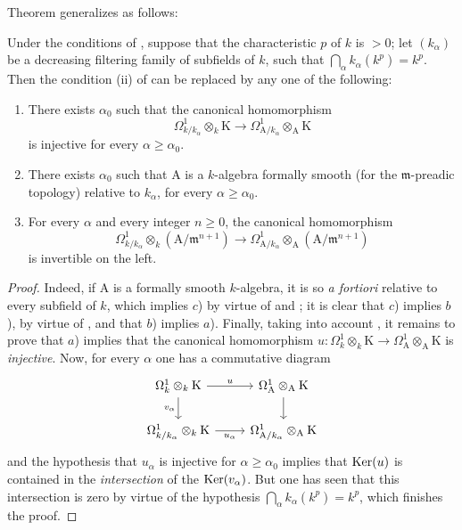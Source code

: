 Theorem  generalizes as follows:

\begin{proposition}[22.2.8]
\label{0.22.2.8}
Under the conditions of , suppose that the characteristic $p$ of $k$ is $>0$; let $(k_\alpha)$ be a decreasing filtering family of subfields of $k$, such that $\bigcap_\alpha k_\alpha(k^p)=k^p$.
Then the condition \textup{(ii)} of  can be replaced by any one of the following:
\begin{enumerate}
  \item[\textup{a)}] There exists $\alpha_0$ such that the canonical homomorphism
  \[
    \Omega^1_{k/k_\alpha}\otimes_k\mathrm{K}\to\Omega^1_{\mathrm{A}/k_\alpha}\otimes_\mathrm{A}\mathrm{K}
  \]
  is injective for every $\alpha\geq\alpha_0$.
  \item[\textup{b)}] There exists $\alpha_0$ such that $\mathrm{A}$ is a $k$-algebra formally smooth (for the $\mathfrak{m}$-preadic topology) relative to $k_\alpha$, for every $\alpha\geq\alpha_0$.
  \item[\textup{c)}] For every $\alpha$ and every integer $n\geq 0$, the canonical homomorphism
  \[
    \Omega^1_{k/k_\alpha}\otimes_k(\mathrm{A}/\mathfrak{m}^{n+1})\to\Omega^1_{\mathrm{A}/k_\alpha}\otimes_\mathrm{A}(\mathrm{A}/\mathfrak{m}^{n+1})
  \]
  is invertible on the left.
\end{enumerate}
\end{proposition}

\begin{proof}
Indeed, if $\mathrm{A}$ is a formally smooth $k$-algebra, it is so \emph{a fortiori} relative to every subfield of $k$, which implies $c$) by virtue of  and ; it is clear that $c$) implies $b$), by virtue of , and that $b$) implies $a$).
Finally, taking into account , it remains to prove that $a$) implies that the canonical homomorphism $u:\Omega^1_k\otimes_k\mathrm{K}\to\Omega^1_\mathrm{A}\otimes_\mathrm{A}\mathrm{K}$ is \emph{injective}.
Now, for every $\alpha$ one has a commutative diagram
\[
  \begin{tikzcd}
    \Omega^1_k\otimes_k\mathrm{K} \ar[r,"u"] \ar[d,"v_\alpha"'] & \Omega^1_\mathrm{A}\otimes_\mathrm{A}\mathrm{K} \ar[d]\\
    \Omega^1_{k/k_\alpha}\otimes_k\mathrm{K} \ar[r,"u_\alpha"'] & \Omega^1_{\mathrm{A}/k_\alpha}\otimes_\mathrm{A}\mathrm{K}
  \end{tikzcd}
\]
and the hypothesis that $u_\alpha$ is injective for $\alpha\geq\alpha_0$ implies that $\operatorname{Ker}(u)$ is contained in the \emph{intersection} of the $\operatorname{Ker}(v_\alpha)$.
But one has seen  that this intersection is zero by virtue of the hypothesis $\bigcap_\alpha k_\alpha(k^p)=k^p$, which finishes the proof.
\end{proof}

